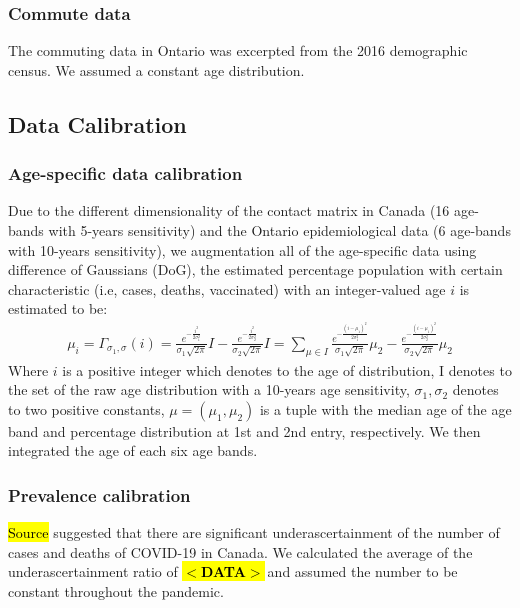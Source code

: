 \documentclass[12pt]{article}
\newcommand{\vect}[1]{\left( #1 \right)}
\newcommand{\pendingdata}{\textbf{\hl{$<$DATA$>$}}$ \ $}
\begin{document}
\subsubsection{Commute data}

The commuting data in Ontario was excerpted from the 2016 demographic census. We assumed a constant age distribution. 


\subsection{Data Calibration}

\subsubsection{Age-specific data calibration}

Due to the different dimensionality of the contact matrix in Canada (16 age-bands with 5-years sensitivity) and the Ontario epidemiological data (6 age-bands with 10-years sensitivity), we augmentation all of the age-specific data using difference of Gaussians (DoG), the estimated percentage population with certain characteristic (i.e, cases, deaths, vaccinated) with an integer-valued age $i$ is estimated to be:
\begin{gather}
    \mu_{i} = \Gamma_{\sigma_1, \sigma} (i) = \frac{e^{-\frac{i^2}{2 \sigma_1^2}}}{\sigma_1 \sqrt{2\pi}} I - \frac{e^{-\frac{i^2}{2 \sigma_2^2}}}{\sigma_2 \sqrt{2\pi}} I = \sum_{\mu \in I} \frac{e^{-\frac{(i - \mu_1)^2}{2 \sigma_1^2}}}{\sigma_1 \sqrt{2\pi}} \mu_2 - \frac{e^{-\frac{(i - \mu_1)^2}{2 \sigma_2^2}}}{\sigma_2 \sqrt{2\pi}} \mu_2
\end{gather}
Where $i$ is a positive integer which denotes to the age of distribution, I denotes to the set of the raw age distribution with a 10-years age sensitivity, $\sigma_1, \sigma_2$ denotes to two positive constants, $\mu = \vect   {\mu_1, \mu_2}$ is a tuple with the median age of the age band and percentage distribution at 1st and 2nd entry, respectively. We then integrated the age of each six age bands. 

\subsubsection{Prevalence calibration}

\hl{Source} suggested that there are significant underascertainment of the number of cases and deaths of COVID-19 in Canada. \cite{ref2} \cite{ref3} We calculated the average of the underascertainment ratio of \pendingdata and assumed the number to be constant throughout the pandemic.
\end{document}
